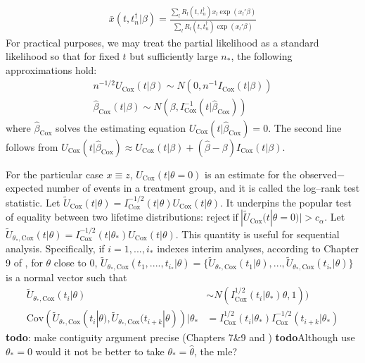 \documentclass{article}
\newcommand{\interim}{i}
\newcommand{\terminal}{i_*}
\newcommand{\tfail}{t^{\dag}}
\newcommand{\atrisk}{R}
\newcommand{\survfullcov}{x}
\newcommand{\nentry}{n}
\newcommand{\nentries}{n_*}
\newcommand{\treatindic}{z}
\newcommand{\treateffect}{\theta}
\newcommand{\coxscore}{U_{\mathrm{Cox}}}%
\newcommand{\coxscorescaled}{\tilde{U}_{\mathrm{Cox}}}
\newcommand{\coxscorescaledformula}[1]{\coxinfo^{-1/2}(#1)U_{\mathrm{Cox}}(#1)}
\newcommand{\coxscorescaledapprox}[1]{\tilde{U}_{#1,\mathrm{Cox}}}
\newcommand{\coxscorescaledapproxformula}[3]{\coxinfo^{-1/2}(#1|#2)U_{\mathrm{Cox}}(#1|#3)}
\newcommand{\coxinfo}{I_{\mathrm{Cox}}}
\newcommand{\coxsurvfulleffectmle}{\hat{\beta}_{\mathrm{Cox}}}
\newcommand{\survfulleffect}{\beta}
\begin{document}
\begin{align}\label{coxscorecompensator}
\bar \survfullcov(t,\tfail_\nentry|\survfulleffect)=\frac{\sum_l \atrisk_l(t,\tfail_\nentry)\survfullcov_l\exp(\survfullcov_l'\survfulleffect)}{\sum_l \atrisk_l(t,\tfail_\nentry)\exp(\survfullcov_l'\survfulleffect)}
\end{align}For practical purposes, we may treat the partial likelihood as a standard likelihood so that for fixed $t$ but sufficiently large $\nentries$, the following approximations hold: 
\begin{align}\label{coxscoreapprox_1}
n^{-1/2}\coxscore(t|\survfulleffect)\sim N(0,n^{-1}\coxinfo(t|\survfulleffect))\\
\coxsurvfulleffectmle(t|\survfulleffect)\sim N(\survfulleffect,\coxinfo^{-1}(t|\coxsurvfulleffectmle))
\end{align}where $\coxsurvfulleffectmle$ solves the estimating equation $\coxscore(t|\coxsurvfulleffectmle)=0$. The second line follows from $\coxscore(t|\coxsurvfulleffectmle)\approx \coxscore(t|\survfulleffect)+(\hat\survfulleffect-\survfulleffect)\coxinfo(t|\survfulleffect)$.

For the particular case $\survfullcov\equiv\treatindic$, $\coxscore(t|\treateffect=0)$ is an estimate for the  observed$-$expected number of events in a  treatment group, and it is called the log--rank test statistic. Let $\coxscorescaled(t|\treateffect)=\coxscorescaledformula{t|\treateffect}$. It underpins the popular test of equality between two lifetime distributions: $\mathrm{reject\ if\ }|\coxscorescaled(t|\treateffect=0)|>c_\alpha$. Let $\coxscorescaledapprox{\treateffect_*}(t|\treateffect)=\coxscorescaledapproxformula{t}{\treateffect_*}{\treateffect}$. This quantity is useful for sequential analysis. Specifically, if $\interim=1,...,\terminal$ indexes interim analyses, according to Chapter 9 of \cite{ibrahim2004}, for $\treateffect$ close to $0$, $\coxscorescaledapprox{\treateffect_*}(t_1,....,t_{\terminal}|\treateffect)=\{\coxscorescaledapprox{\treateffect_*}(t_1|\treateffect),...,\coxscorescaledapprox{\treateffect_*}(t_{\terminal}|\treateffect)\}$ is a normal vector such that
\begin{align}\label{coxscorescaledapproxdist}
\coxscorescaledapprox{\treateffect_*}(t_\interim|\treateffect)&\sim N(\coxinfo^{1/2}(t_\interim|\treateffect_*)\treateffect,1))\\\label{coxscorescaledapproxdist2}
\mathrm{Cov}(\coxscorescaledapprox{\treateffect_*}(t_i|\treateffect),\coxscorescaledapprox{\treateffect_*}(t_{i+k}|\treateffect))|\treateffect_*&=\coxinfo^{1/2}(t_\interim|\treateffect_*)\coxinfo^{-1/2}(t_{\interim+k}|\treateffect_*)
\end{align}\textbf{todo}: make contiguity argument precise (Chapters 7\&9\cite{vaart1998} and \cite{bilias1997}) \textbf{todo}Although \cite{ibrahim2004} use $\treateffect_*=0$ would it not be better to take $\treateffect_*=\hat\treateffect$, the mle?
\end{document}
